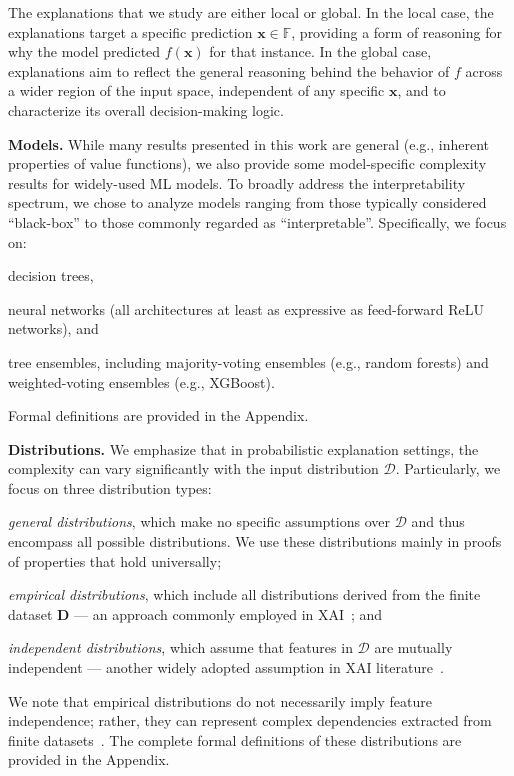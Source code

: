 \documentclass{article}
\newcommand{\z}{\textbf{z}}
\newcommand{\x}{\textbf{x}}
\begin{document}


The explanations that we study are either local or global. In the local case, the explanations target a specific prediction $\x\in\mathbb{F}$, providing a form of reasoning for why the model predicted $f(\x)$ for that instance. In the global case, explanations aim to reflect the general reasoning behind the behavior of $f$ across a wider region of the input space, independent of any specific $\x$, and to characterize its overall decision-making logic.


\textbf{Models.} While many results presented in this work are general (e.g., inherent properties of value functions), we also provide some model-specific complexity results for widely-used ML models. To broadly address the interpretability spectrum, we chose to analyze models ranging from those typically considered ``black-box'' to those commonly regarded as ``interpretable''. Specifically, we focus on: \begin{inparaenum}[(i)] \item decision trees, \item neural networks (all architectures at least as expressive as feed-forward ReLU networks), and \item tree ensembles, including majority-voting ensembles (e.g., random forests) and weighted-voting ensembles (e.g., XGBoost).
\end{inparaenum} Formal definitions are provided in the Appendix. 

\textbf{Distributions.} We emphasize that in probabilistic explanation settings, the complexity can vary significantly with the input distribution $\mathcal{D}$. Particularly, we focus on three distribution types:
\begin{inparaenum}[(i)] \item \emph{general distributions}, which make no specific assumptions over $\mathcal{D}$ and thus encompass all possible distributions. We use these distributions mainly in proofs of properties that hold universally; \item \emph{empirical distributions}, which include all distributions derived from the finite dataset $\mathbf{D}$ --- an approach commonly employed in XAI~\citep{lundberg2017unified, van2022tractability}; and
\item \emph{independent distributions}, which assume that features in $\mathcal{D}$ are mutually independent --- another widely adopted assumption in XAI literature~\citep{arenas2022computing, arenas2023complexity, lundberg2017unified, ribeiro2018anchors}.
\end{inparaenum} We note that empirical distributions do not necessarily imply feature independence; rather, they can represent complex dependencies extracted from finite datasets~\citep{van2022tractability}. The complete formal definitions of these distributions are provided in the Appendix.
\end{document}
